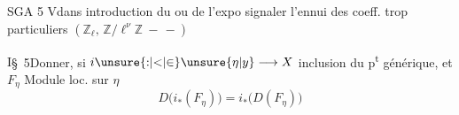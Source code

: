 \noindent SGA 5 \(\mathrm{V}\)\quad dans introduction du  ou de l'expo signaler l'ennui des coeff. trop particuliers \((\mathbb{Z}_{\ell},\,\mathbb{Z}/\ell^{\nu}\mathbb{Z}\ -\,-)\)


\noindent \(\mathrm{I}\)\quad \S\ 5\qquad Donner, si \(i\unsure{{:}|{<}|{\in}}\unsure{\eta|y}\longrightarrow X\) inclusion du p\textsuperscript{t} générique, et \(F_{\eta}\) Module loc.  sur \(\eta\)
\[
 D\bigl(i_{*}(F_{\eta})\bigr)=i_{*}\bigl(D(F_{\eta})\bigr)
\]
\clearpage
